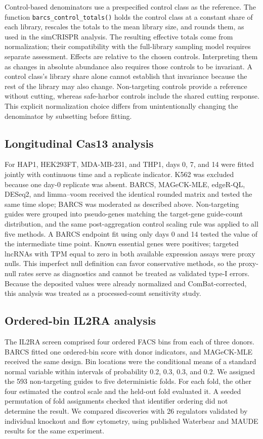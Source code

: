 Control-based denominators use a prespecified control class as the reference.
The function \texttt{barcs\_control\_totals()} holds the control class at a
constant share of each library, rescales the totals to the mean library size,
and rounds them, as used in the simCRISPR analysis.  The resulting effective totals
come from normalization; their compatibility with the full-library sampling
model requires separate assessment.  Effects are relative to the chosen
controls.  Interpreting them as changes in absolute abundance also requires
those controls to be invariant.  A control class's library share alone cannot
establish that invariance because the rest of the library may also change.
Non-targeting controls provide a reference without cutting, whereas
safe-harbor controls include the shared cutting response.  This explicit
normalization choice differs from unintentionally changing the denominator by
subsetting before fitting.

\subsection{Longitudinal Cas13 analysis}

For HAP1, HEK293FT, MDA-MB-231, and THP1, days 0, 7, and 14 were fitted
jointly with continuous time and a replicate indicator.  K562 was excluded
because one day-0 replicate was absent.  BARCS, MAGeCK-MLE, edgeR-QL, DESeq2,
and limma--voom received the identical rounded matrix and tested the same time
slope; BARCS was moderated as described above.  Non-targeting guides were grouped into pseudo-genes matching the
target-gene guide-count distribution, and the same post-aggregation control
scaling rule was applied to all five methods.  A BARCS endpoint fit using only
days 0 and 14 tested the value of the intermediate time point.  Known
essential genes were positives; targeted lncRNAs with TPM equal to zero in
both available expression assays were proxy nulls.  This imperfect null
definition can favor conservative methods, so the proxy-null rates serve as
diagnostics and cannot be treated as validated type-I errors.  Because the
deposited values were already normalized and ComBat-corrected, this analysis
was treated as a processed-count sensitivity study.

\subsection{Ordered-bin IL2RA analysis}

The IL2RA screen comprised four ordered FACS bins from each of three donors.
BARCS fitted one ordered-bin score with donor indicators, and MAGeCK-MLE
received the same design.  Bin locations were the conditional means of a
standard normal variable within intervals of probability 0.2, 0.3, 0.3, and
0.2.  We assigned the 593 non-targeting guides to five
deterministic folds.  For each fold, the other four estimated the control
scale and the held-out fold evaluated it.  A seeded permutation of fold
assignments checked that identifier ordering did not determine the result.  We
compared discoveries with 26 regulators validated by individual knockout and
flow cytometry, using published Waterbear and MAUDE results for the same
experiment.

